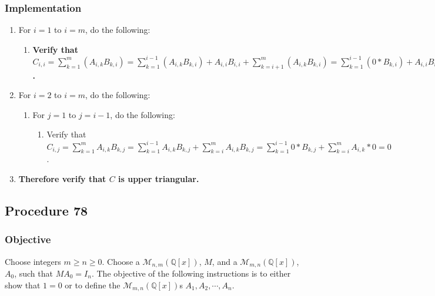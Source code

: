 \documentclass[twocolumn]{article}
\begin{document}
			\subsubsection{Implementation}
				\begin{enumerate}
					\item For $i=1$ to $i=m$, do the following:
					\begin{enumerate}
						\item \textbf{Verify that $C_{i,i}=\sum_{k=1}^m (A_{i,k}B_{k,i})=\sum_{k=1}^{i-1} (A_{i,k}B_{k,i})+A_{i,i}B_{i,i}+\sum_{k=i+1}^m (A_{i,k}B_{k,i})=\sum_{k=1}^{i-1} (0*B_{k,i})+A_{i,i}B_{i,i}+\sum_{k=i+1}^m (A_{i,k}*0)=A_{i,i}B_{i,i}$.}
					\end{enumerate}
					\item For $i=2$ to $i=m$, do the following:
					\begin{enumerate}
						\item For $j=1$ to $j=i-1$, do the following:
						\begin{enumerate}
							\item Verify that $C_{i,j}=\sum_{k=1}^m A_{i,k}B_{k,j}=\sum_{k=1}^{i-1} A_{i,k}B_{k,j}+\sum_{k=i}^m A_{i,k}B_{k,j}=\sum_{k=1}^{i-1} 0*B_{k,j}+\sum_{k=i}^m A_{i,k}*0=0$.
						\end{enumerate}
					\end{enumerate}
					\item \textbf{Therefore verify that $C$ is upper triangular.}
				\end{enumerate}
		\subsection{Procedure 78}\label{sec:procedure 78}
			\subsubsection{Objective}
				Choose integers $m\ge n\ge 0$. Choose a $\mathcal{M}_{n,m}(\mathbb{Q}[x])$, $M$, and a $\mathcal{M}_{m,n}(\mathbb{Q}[x])$, $A_0$, such that $MA_0=I_n$. The objective of the following instructions is to either show that $1=0$ or to define the $\mathcal{M}_{m,n}(\mathbb{Q}[x])$s $A_1,A_2,\cdots,A_n$.
\end{document}

